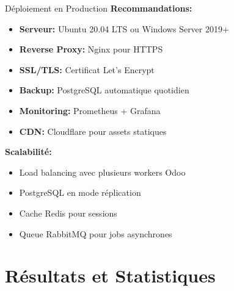 \documentclass[aspectratio=169]{beamer}
\begin{document}
\begin{frame}{Déploiement en Production}
    \textbf{Recommandations:}
    \begin{itemize}
        \item \textbf{Serveur:} Ubuntu 20.04 LTS ou Windows Server 2019+
        \item \textbf{Reverse Proxy:} Nginx pour HTTPS
        \item \textbf{SSL/TLS:} Certificat Let's Encrypt
        \item \textbf{Backup:} PostgreSQL automatique quotidien
        \item \textbf{Monitoring:} Prometheus + Grafana
        \item \textbf{CDN:} Cloudflare pour assets statiques
    \end{itemize}
    
    \vspace{10pt}
    \textbf{Scalabilité:}
    \begin{itemize}
        \item Load balancing avec plusieurs workers Odoo
        \item PostgreSQL en mode réplication
        \item Cache Redis pour sessions
        \item Queue RabbitMQ pour jobs asynchrones
    \end{itemize}
\end{frame}

\section{Résultats et Statistiques}
\end{document}

